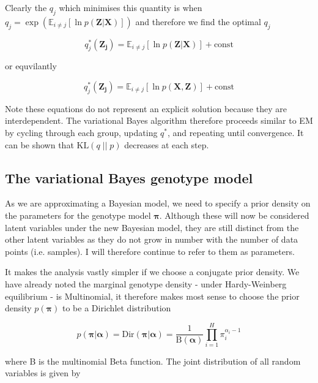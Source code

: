 \documentclass{article}
\begin{document}
Clearly the $q_j$ which minimises this quantity is when $q_j = \exp(\mathbb{E}_{i \ne j}[\ln p(\boldsymbol{Z} | \boldsymbol{X})])$ and therefore we find the optimal $q_j$

\begin{equation}
q^*_j(\boldsymbol{Z_j}) = \mathbb{E}_{i \ne j}[\ln p(\boldsymbol{Z} | \boldsymbol{X})] + \text{const}
\end{equation}

or equvilantly

\begin{equation}
\label{eq:q_opt}
q^*_j(\boldsymbol{Z_j}) = \mathbb{E}_{i \ne j}[\ln p(\boldsymbol{X}, \boldsymbol{Z})] + \text{const}
\end{equation}

Note these equations do not represent an explicit solution because they are interdependent. The variational Bayes algorithm therefore proceeds similar to EM by cycling through each group, updating $q^*$, and repeating until convergence. It can be shown that $\text{KL}(q\; ||\; p)$ decreases at each step.

\subsection{The variational Bayes genotype model}

As we are approximating a Bayesian model, we need to specify a prior density on the parameters for the genotype model $\boldsymbol{\pi}$. Although these will now be considered latent variables under the new Bayesian model, they are still distinct from the other latent variables as they do not grow in number with the number of data points (i.e. samples). I will therefore continue to refer to them as parameters. 

It makes the analysis vastly simpler if we choose a conjugate prior density. We have already noted the marginal genotype density - under Hardy-Weinberg equilibrium - is Multinomial, it therefore makes most sense to choose the prior density $p(\boldsymbol{\pi})$ to be a Dirichlet distribution

\begin{equation}
p(\boldsymbol{\pi} | \boldsymbol{\alpha}) = \text{Dir}(\boldsymbol{\pi} | \boldsymbol{\alpha}) = \frac{1}{\text{B}(\boldsymbol{\alpha})} \prod_{i = 1}^H \pi_i^{\alpha_i - 1}
\end{equation}

where B is the multinomial Beta function. The joint distribution of all random variables is given by
\end{document}
